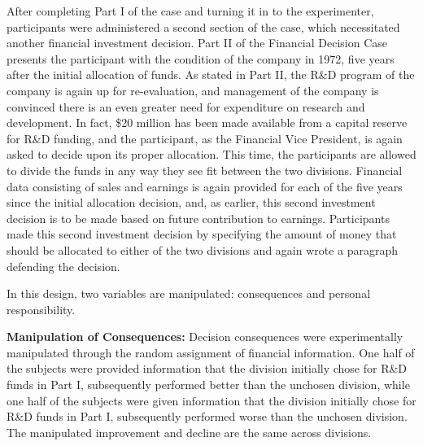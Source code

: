 \documentclass{article}
\begin{document}
After completing Part I of the case and turning it in to the experimenter, participants were administered a second section of the case, which necessitated another financial investment decision. Part II of the Financial Decision Case presents the participant with the condition of the company in 1972, five years after the initial allocation of funds. As stated in Part II, the R\&D program of the company is again up for re-evaluation, and management of the company is convinced there is an even greater need for expenditure on research and development. In fact, \$20 million has been made available from a capital reserve for R\&D funding, and the participant, as the Financial Vice President, is again asked to decide upon its proper allocation. This time, the participants are allowed to divide the funds in any way they see fit between the two divisions. Financial data consisting of sales and earnings is again provided for each of the five years since the initial allocation decision, and, as earlier, this second investment decision is to be made based on future contribution to earnings. Participants made this second investment decision by specifying the amount of money that should be allocated to either of the two divisions and again wrote a paragraph defending the decision.

In this design, two variables are manipulated: consequences and personal responsibility. 

\textbf{Manipulation of Consequences:} Decision consequences were experimentally manipulated through the random assignment of financial information. One half of the subjects were provided information that the division initially chose for R\&D funds in Part I, subsequently performed better than the unchosen division, while one half of the subjects were given information that the division initially chose for R\&D funds in Part I, subsequently performed worse than the unchosen division. The manipulated improvement and decline are the same across divisions.
\end{document}
